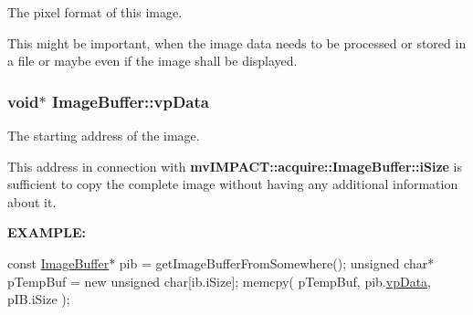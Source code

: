 The pixel format of this image. 

This might be important, when the image data needs to be processed or stored in a file or maybe even if the image shall be displayed. \hypertarget{struct_image_buffer_ab67c9c21d749e786302c848b508e0673}{
\subsubsection[{vp\+Data}]{\setlength{\rightskip}{0pt plus 5cm}void$\ast$ Image\+Buffer\+::vp\+Data}}\label{struct_image_buffer_ab67c9c21d749e786302c848b508e0673}


The starting address of the image. 

This address in connection with {\bfseries mv\+I\+M\+P\+A\+C\+T\+::acquire\+::\+Image\+Buffer\+::i\+Size} is sufficient to copy the complete image without having any additional information about it.

{\bfseries E\+X\+A\+M\+P\+L\+E\+:}~\newline
~\newline
 
\begin{DoxyCode}
\textcolor{keyword}{const} \hyperlink{struct_image_buffer}{ImageBuffer}* pib = getImageBufferFromSomewhere();
\textcolor{keywordtype}{unsigned} \textcolor{keywordtype}{char}* pTempBuf = \textcolor{keyword}{new} \textcolor{keywordtype}{unsigned} \textcolor{keywordtype}{char}[ib.iSize];
memcpy( pTempBuf, pib.\hyperlink{struct_image_buffer_ab67c9c21d749e786302c848b508e0673}{vpData}, pIB.iSize );
\end{DoxyCode}


